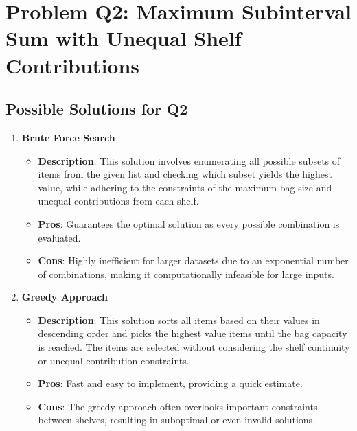 \documentclass{article}
\begin{document}
\section{Problem Q2: Maximum Subinterval Sum with Unequal Shelf Contributions}

\subsection{Possible Solutions for Q2}

\begin{enumerate}
    \item \textbf{Brute Force Search}
    \begin{itemize}
        \item \textbf{Description}: This solution involves enumerating all possible subsets of items from the given list and checking which subset yields the highest value, while adhering to the constraints of the maximum bag size and unequal contributions from each shelf.
        \item \textbf{Pros}: Guarantees the optimal solution as every possible combination is evaluated.
        \item \textbf{Cons}: Highly inefficient for larger datasets due to an exponential number of combinations, making it computationally infeasible for large inputs.
    \end{itemize}

    \item \textbf{Greedy Approach}
    \begin{itemize}
        \item \textbf{Description}: This solution sorts all items based on their values in descending order and picks the highest value items until the bag capacity is reached. The items are selected without considering the shelf continuity or unequal contribution constraints.
        \item \textbf{Pros}: Fast and easy to implement, providing a quick estimate.
        \item \textbf{Cons}: The greedy approach often overlooks important constraints between shelves, resulting in suboptimal or even invalid solutions.
    \end{itemize}


\end{enumerate}
\end{document}
